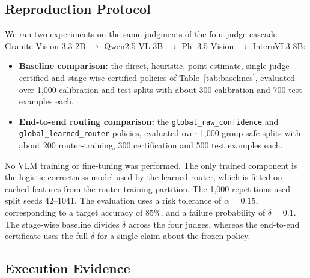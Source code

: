 \documentclass[11pt]{article}
\newcommand{\todo}[1]{\textcolor{red}{\textbf{[TEAM TO COMPLETE: #1]}}}
\begin{document}
\subsection{Reproduction Protocol}

We ran two experiments on the same judgments of the four-judge cascade Granite Vision 3.3 2B $\rightarrow$ Qwen2.5-VL-3B $\rightarrow$ Phi-3.5-Vision $\rightarrow$ InternVL3-8B:
\begin{itemize}
    \item \textbf{Baseline comparison:} the direct, heuristic, point-estimate, single-judge certified and stage-wise certified policies of Table~\ref{tab:baselines}, evaluated over 1,000 calibration and test splits with about 300 calibration and 700 test examples each.
    \item \textbf{End-to-end routing comparison:} the \texttt{global\_raw\_confidence} and \texttt{global\_learned\_router} policies, evaluated over 1,000 group-safe splits with about 200 router-training, 300 certification and 500 test examples each.
\end{itemize}

No VLM training or fine-tuning was performed. The only trained component is the logistic correctness model used by the learned router, which is fitted on cached features from the router-training partition. The 1,000 repetitions used split seeds 42--1041. The evaluation uses a risk tolerance of $\alpha=0.15$, corresponding to a target accuracy of 85\%, and a failure probability of $\delta=0.1$. The stage-wise baseline divides $\delta$ across the four judges, whereas the end-to-end certificate uses the full $\delta$ for a single claim about the frozen policy.

\subsection{Execution Evidence}
\end{document}
